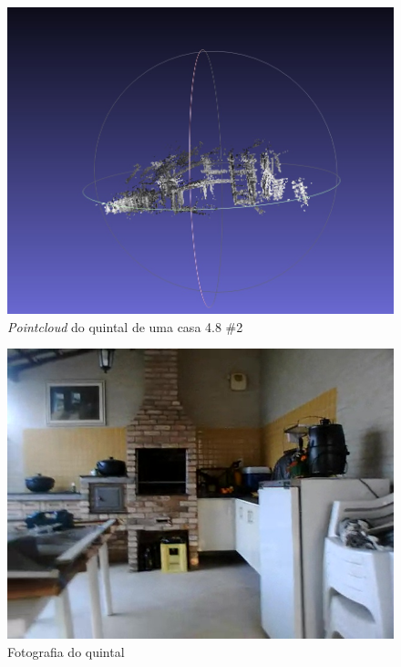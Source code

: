 \begin{figure}[!htb]
	\centering
		\includegraphics[width= \textwidth]{Imagens/figura4-11.jpg}
	\caption{\textit{Pointcloud} do quintal de uma casa 4.8 \#2}
	\label{fig4:11}
\end{figure}

\begin{figure}[!htb]
	\centering
		\includegraphics[width= \textwidth]{Imagens/figura4-12.jpg}
	\caption{Fotografia do quintal}
	\label{fig4:12}
\end{figure}


